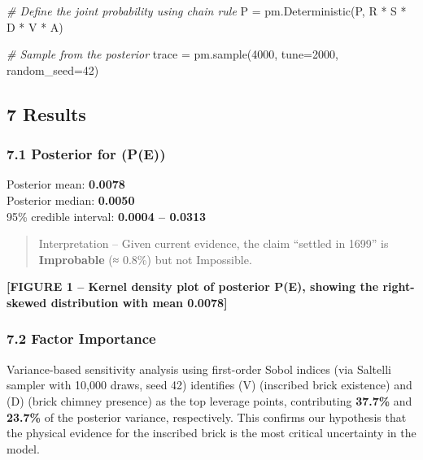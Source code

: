 \documentclass[
  11pt,
]{article}
\newenvironment{Shaded}{}{}
\newcommand{\CommentTok}[1]{\textcolor[rgb]{0.38,0.63,0.69}{\textit{#1}}}
\newcommand{\DecValTok}[1]{\textcolor[rgb]{0.25,0.63,0.44}{#1}}
\newcommand{\NormalTok}[1]{#1}
\newcommand{\OperatorTok}[1]{\textcolor[rgb]{0.40,0.40,0.40}{#1}}
\newcommand{\StringTok}[1]{\textcolor[rgb]{0.25,0.44,0.63}{#1}}
\begin{document}
\begin{Shaded}
\begin{Highlighting}[]
    \CommentTok{\# Define the joint probability using chain rule}
\NormalTok{    P }\OperatorTok{=}\NormalTok{ pm.Deterministic(}\StringTok{\textquotesingle{}P\textquotesingle{}}\NormalTok{, R }\OperatorTok{*}\NormalTok{ S }\OperatorTok{*}\NormalTok{ D }\OperatorTok{*}\NormalTok{ V }\OperatorTok{*}\NormalTok{ A)}
    
    \CommentTok{\# Sample from the posterior}
\NormalTok{    trace }\OperatorTok{=}\NormalTok{ pm.sample(}\DecValTok{4000}\NormalTok{, tune}\OperatorTok{=}\DecValTok{2000}\NormalTok{, random\_seed}\OperatorTok{=}\DecValTok{42}\NormalTok{)}
\end{Highlighting}
\end{Shaded}

\subsection{7 Results}\label{results}

\subsubsection{7.1 Posterior for (P(E))}\label{posterior-for-pe}

Posterior mean: \textbf{0.0078}\\
Posterior median: \textbf{0.0050}\\
95\% credible interval: \textbf{0.0004 -- 0.0313}

\begin{quote}
Interpretation -- Given current evidence, the claim ``settled in 1699''
is \textbf{Improbable} (≈ 0.8\%) but not Impossible.
\end{quote}

\textbf{{[}FIGURE 1 -- Kernel density plot of posterior P(E), showing
the right-skewed distribution with mean 0.0078{]}}

\subsubsection{7.2 Factor Importance}\label{factor-importance}

Variance-based sensitivity analysis using first-order Sobol indices (via
Saltelli sampler with 10,000 draws, seed 42) identifies (V) (inscribed
brick existence) and (D) (brick chimney presence) as the top leverage
points, contributing \textbf{37.7\%} and \textbf{23.7\%} of the
posterior variance, respectively. This confirms our hypothesis that the
physical evidence for the inscribed brick is the most critical
uncertainty in the model.
\end{document}
